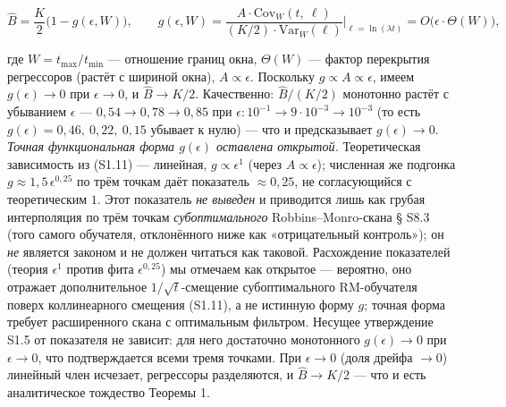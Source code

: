 \documentclass[12pt]{iopart}
\begin{document}
\begin{equation}\hat B = \frac{K}{2}\big(1 - g(\epsilon, W)\big), \qquad g(\epsilon, W) = \frac{A\cdot\mathrm{Cov}_W(t,\ \ell)}{(K/2)\cdot\mathrm{Var}_W(\ell)}\bigg|_{\ell = \ln(\lambda t)} = O\big(\epsilon\cdot\Theta(W)\big), \tag{S1.11}\end{equation}



где \(W = t_{\max}/t_{\min}\) --- отношение границ окна, \(\Theta(W)\) --- фактор перекрытия регрессоров (растёт с шириной окна), \(A \propto \epsilon\). Поскольку \(g \propto A \propto \epsilon\), имеем \(g(\epsilon) \to 0\) при \(\epsilon \to 0\), и \(\hat B \to K/2\). Качественно: \(\hat B/(K/2)\) монотонно растёт с убыванием \(\epsilon\) --- \(0{,}54 \to 0{,}78 \to 0{,}85\) при \(\epsilon: 10^{-1} \to 9\cdot10^{-3} \to 10^{-3}\) (то есть \(g(\epsilon) = 0{,}46,\ 0{,}22,\ 0{,}15\) убывает к нулю) --- что и предсказывает \(g(\epsilon) \to 0\). \emph{Точная функциональная форма \(g(\epsilon)\) оставлена открытой.} Теоретическая зависимость из (S1.11) --- линейная, \(g \propto \epsilon^1\) (через \(A \propto \epsilon\)); численная же подгонка \(g \approx 1{,}5\,\epsilon^{0{,}25}\) по трём точкам даёт показатель \(\approx 0{,}25\), не согласующийся с теоретическим \(1\). Этот показатель \emph{не выведен} и приводится лишь как грубая интерполяция по трём точкам \emph{субоптимального} Robbins--Monro-скана § S8.3 \cite{Andriishin2026b} (того самого обучателя, отклонённого ниже как «отрицательный контроль»); он \emph{не} является законом и не должен читаться как таковой. Расхождение показателей (теория \(\epsilon^1\) против фита \(\epsilon^{0{,}25}\)) мы отмечаем как открытое --- вероятно, оно отражает дополнительное \(1/\sqrt t\)-смещение субоптимального RM-обучателя поверх коллинеарного смещения (S1.11), а не истинную форму \(g\); точная форма требует расширенного скана с оптимальным фильтром. Несущее утверждение S1.5 от показателя не зависит: для него достаточно монотонного \(g(\epsilon) \to 0\) при \(\epsilon \to 0\), что подтверждается всеми тремя точками. При \(\epsilon \to 0\) (доля дрейфа \(\to 0\)) линейный член исчезает, регрессоры разделяются, и \(\hat B \to K/2\) --- что и есть аналитическое тождество Теоремы 1.
\end{document}
